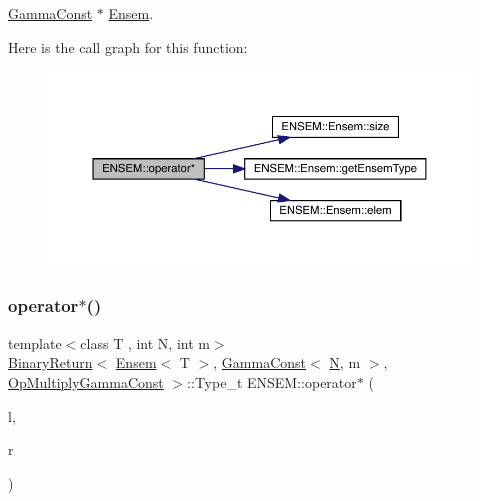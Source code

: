 \mbox{\hyperlink{classENSEM_1_1GammaConst}{Gamma\+Const}} $\ast$ \mbox{\hyperlink{classENSEM_1_1Ensem}{Ensem}}. 

Here is the call graph for this function\+:\nopagebreak
\begin{figure}[H]
\begin{center}
\leavevmode
\includegraphics[width=350pt]{d1/d9e/group__eensem_gab92286e5b611f00cb8f733f9d41d06a4_cgraph}
\end{center}
\end{figure}
\mbox{\label{group__eensem_gaada3f84ca5744bafe60557482cc90c26}} 
\subsubsection{\texorpdfstring{operator$\ast$()}{operator*()}\hspace{0.1cm}{\footnotesize\ttfamily [5/11]}}
{\footnotesize\ttfamily template$<$class T , int N, int m$>$ \\
\mbox{\hyperlink{structENSEM_1_1BinaryReturn}{Binary\+Return}}$<$ \mbox{\hyperlink{classENSEM_1_1Ensem}{Ensem}}$<$ T $>$, \mbox{\hyperlink{classENSEM_1_1GammaConst}{Gamma\+Const}}$<$ \mbox{\hyperlink{adat__devel_2lib_2hadron_2operator__name__util_8cc_a7722c8ecbb62d99aee7ce68b1752f337}{N}}, m $>$, \mbox{\hyperlink{structENSEM_1_1OpMultiplyGammaConst}{Op\+Multiply\+Gamma\+Const}} $>$\+::Type\+\_\+t E\+N\+S\+E\+M\+::operator$\ast$ (\begin{DoxyParamCaption}\item[{const \mbox{\hyperlink{classENSEM_1_1Ensem}{Ensem}}$<$ T $>$ \&}]{l,  }\item[{const \mbox{\hyperlink{classENSEM_1_1GammaConst}{Gamma\+Const}}$<$ \mbox{\hyperlink{adat__devel_2lib_2hadron_2operator__name__util_8cc_a7722c8ecbb62d99aee7ce68b1752f337}{N}}, m $>$ \&}]{r }\end{DoxyParamCaption})\hspace{0.3cm}{\ttfamily [inline]}}



